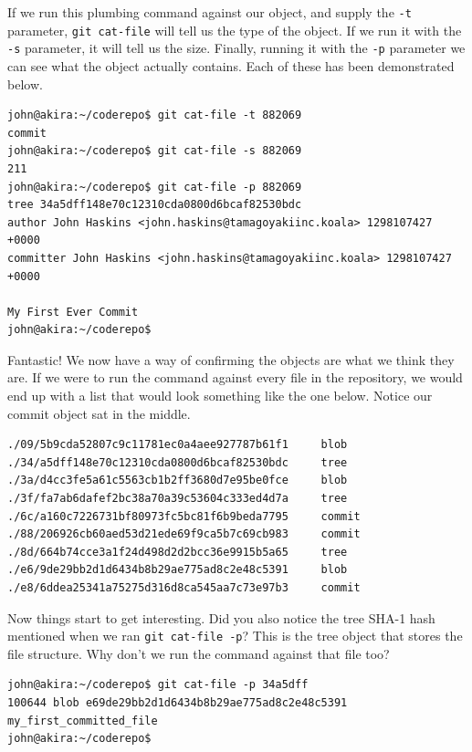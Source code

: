 If we run this plumbing command against our object, and supply the \texttt{-t} parameter, \texttt{git cat-file} will tell us the type of the object.  If we run it with the \texttt{-s} parameter, it will tell us the size.  Finally, running it with the \texttt{-p} parameter we can see what the object actually contains.  Each of these has been demonstrated below.

\begin{Verbatim}[frame=leftline,framerule=1mm,fontsize=\relsize{-3}]
john@akira:~/coderepo$ git cat-file -t 882069
commit
john@akira:~/coderepo$ git cat-file -s 882069
211
john@akira:~/coderepo$ git cat-file -p 882069
tree 34a5dff148e70c12310cda0800d6bcaf82530bdc
author John Haskins <john.haskins@tamagoyakiinc.koala> 1298107427 +0000
committer John Haskins <john.haskins@tamagoyakiinc.koala> 1298107427 +0000

My First Ever Commit
john@akira:~/coderepo$ 
\end{Verbatim}

Fantastic!  We now have a way of confirming the objects are what we think they are.  If we were to run the command against every file in the repository, we would end up with a list that would look something like the one below.  Notice our commit object sat in the middle.

\begin{Verbatim}[frame=leftline,framerule=1mm,fontsize=\relsize{-3}]
./09/5b9cda52807c9c11781ec0a4aee927787b61f1		blob
./34/a5dff148e70c12310cda0800d6bcaf82530bdc		tree
./3a/d4cc3fe5a61c5563cb1b2ff3680d7e95be0fce		blob
./3f/fa7ab6dafef2bc38a70a39c53604c333ed4d7a		tree
./6c/a160c7226731bf80973fc5bc81f6b9beda7795		commit
./88/206926cb60aed53d21ede69f9ca5b7c69cb983		commit
./8d/664b74cce3a1f24d498d2d2bcc36e9915b5a65		tree
./e6/9de29bb2d1d6434b8b29ae775ad8c2e48c5391		blob
./e8/6ddea25341a75275d316d8ca545aa7c73e97b3		commit
\end{Verbatim}

Now things start to get interesting.  Did you also notice the tree SHA-1 hash mentioned when we ran \texttt{git cat-file -p}?  This is the tree object that stores the file structure.  Why don't we run the command against that file too?

\begin{Verbatim}[frame=leftline,framerule=1mm,fontsize=\relsize{-3}]
john@akira:~/coderepo$ git cat-file -p 34a5dff
100644 blob e69de29bb2d1d6434b8b29ae775ad8c2e48c5391	my_first_committed_file
john@akira:~/coderepo$ 
\end{Verbatim}

